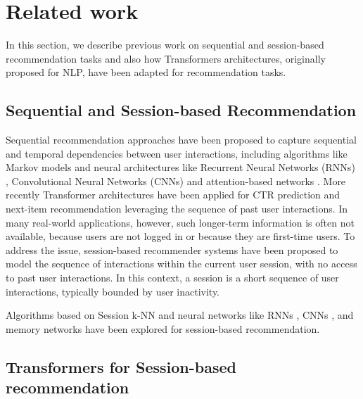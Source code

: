 \documentclass[sigconf,screen]{acmart}
\begin{document}
\section{Related work}
\label{sec:related_work}
In this section, we describe previous work on sequential and session-based recommendation tasks and also how Transformers architectures, originally proposed for NLP, have been adapted for recommendation tasks.

\vspace{-1.4mm}
\subsection{Sequential and Session-based Recommendation}



Sequential recommendation approaches have been proposed to capture sequential and temporal dependencies between user interactions, including algorithms like Markov models \cite{he2009web,garcin2013personalized,kapoor2015just} and neural architectures like Recurrent Neural Networks (RNNs) \cite{hidasi2015session}, Convolutional Neural Networks (CNNs) \cite{tang2018personalized, wang2019towards} and attention-based networks \cite{wang2020time}. More recently Transformer architectures \cite{wu2020sse,lin2020fissa,sun2019bert4rec,kang2018self,zhang2019next,chen2020improving} have been applied for CTR prediction and next-item recommendation leveraging the sequence of past user interactions. In many real-world applications, however, such longer-term information is often not available, because users are not logged in or because they are first-time users. To address the issue, session-based recommender systems \cite{malte2020empirical} have been proposed to model the sequence of interactions within the current user session, with no access to past user interactions. In this context, a session is a short sequence of user interactions, typically bounded by user inactivity. 

Algorithms based on Session k-NN \cite{malte2020empirical} and neural networks like RNNs \cite{hidasi2015session,moreira2018news,gabriel2019contextual}, CNNs \cite{yuan2019simple}, and memory networks \cite{mi2020memory} have been explored for session-based recommendation. 

\subsection{Transformers for Session-based recommendation}
\end{document}
